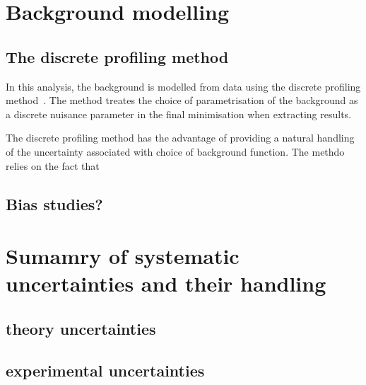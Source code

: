 

\section{Background modelling}
\label{model:sec:background_model}
\subsection{The discrete profiling method}

In this analysis, the background is modelled from data using the discrete profiling method~\cite{DiscreteProfiling}. The method treates the choice of parametrisation of the background as a discrete nuisance parameter in the final minimisation when extracting results. 

The discrete profiling method has the advantage of providing a natural handling of the uncertainty associated with choice of background function. The methdo relies on the fact that 

\subsection{Bias studies?}

\section{Sumamry of systematic uncertainties and their handling}

\subsection{theory uncertainties}
\subsection{experimental uncertainties}

